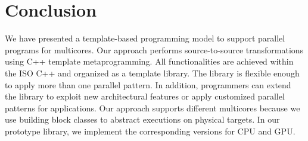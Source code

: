 \section{Conclusion}\label{sec:con}


We have presented a template-based programming model to support parallel
programs for multicores. Our approach performs source-to-source
transformations using C++ template metaprogramming. All functionalities
are achieved within the ISO C++ and organized as a template library. The
library is flexible enough to
apply more than one parallel
pattern. In addition, programmers can extend the library to
exploit new architectural
features or apply customized parallel patterns for applications. Our approach supports different multicores because we use building
block classes to abstract executions on physical targets. In our
prototype library, we implement the corresponding versions for CPU
and GPU.



